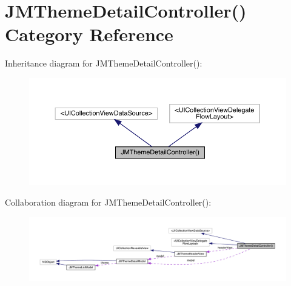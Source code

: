 \hypertarget{category_j_m_theme_detail_controller_07_08}{}\section{J\+M\+Theme\+Detail\+Controller() Category Reference}
\label{category_j_m_theme_detail_controller_07_08}


Inheritance diagram for J\+M\+Theme\+Detail\+Controller()\+:\nopagebreak
\begin{figure}[H]
\begin{center}
\leavevmode
\includegraphics[width=350pt]{category_j_m_theme_detail_controller_07_08__inherit__graph}
\end{center}
\end{figure}


Collaboration diagram for J\+M\+Theme\+Detail\+Controller()\+:\nopagebreak
\begin{figure}[H]
\begin{center}
\leavevmode
\includegraphics[width=350pt]{category_j_m_theme_detail_controller_07_08__coll__graph}
\end{center}
\end{figure}
